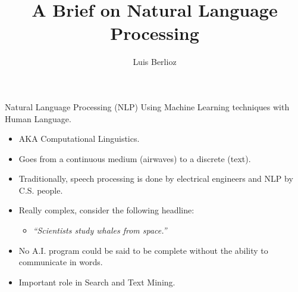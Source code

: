 \documentclass[handout]{beamer}
\title{A Brief on Natural Language Processing}
\author{Luis Berlioz}
\begin{document}
\maketitle

\begin{frame}{Natural Language Processing (NLP)}
    Using Machine Learning techniques with Human Language.
    \begin{itemize}
            \item AKA Computational Linguistics.
            \item Goes from a continuous medium (airwaves) to a discrete (text).
        \item Traditionally, speech processing is done by electrical engineers and NLP by C.S. people.
            \item Really complex, consider the following headline:
                \begin{itemize}
                    \item \textit{``Scientists study whales from space.''}
                \end{itemize}
    \item No A.I. program could be said to be complete without the ability to communicate in words.
        \item Important role in Search and Text Mining.
    \end{itemize}
     
\end{frame}
\end{document}
